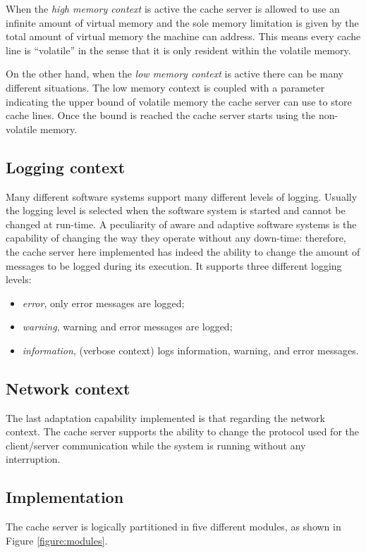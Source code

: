 \documentclass[11pt,a4paper]{article}
\begin{document}
When the \emph{high memory context} is active the cache server is allowed to use an infinite amount of virtual memory and the sole memory limitation is given by the total amount of virtual memory the machine can address. This means every cache line is ``volatile'' in the sense that it is only resident within the volatile memory.

On the other hand, when the \emph{low memory context} is active there can be many different situations. The low memory context is coupled with a parameter indicating the upper bound of volatile memory the cache server can use to store cache lines. Once the bound is reached the cache server starts using the non-volatile memory.

\subsection{Logging context}
\label{section:work:logging-context}
Many different software systems support many different levels of logging. Usually the logging level is selected when the software system is started and cannot be changed at run-time. A peculiarity of aware and adaptive software systems is the capability of changing the way they operate without any down-time: therefore, the cache server here implemented has indeed the ability to change the amount of messages to be logged during its execution. It supports three different logging levels:
\begin{itemize}
\item \emph{error}, only error messages are logged;
\item \emph{warning}, warning and error messages are logged;
\item \emph{information}, (verbose context) logs information, warning, and error messages.
\end{itemize}

\subsection{Network context}
\label{section:work:network-context}
The last adaptation capability implemented is that regarding the network context. The cache server supports the ability to change the protocol used for the client/server communication while the system is running without any interruption.

\subsection{Implementation}
\label{section:work:implementation}
The cache server is logically partitioned in five different modules, as shown in Figure \ref{figure:modules}.
\end{document}
